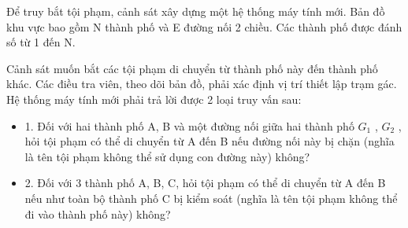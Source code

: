 Để truy bắt tội phạm, cảnh sát xây dựng một hệ thống máy tính mới. Bản đồ khu vực bao gồm N thành phố và E đường nối 2 chiều. Các thành phố được đánh số từ 1 đến N.  

   Cảnh sát muốn bắt các tội phạm di chuyển từ thành phố này đến thành phố khác. Các điều tra viên, theo dõi bản đồ, phải xác định vị trí thiết lập trạm gác. Hệ thống máy tính mới phải trả lời được 2 loại   truy vấn sau:  
\begin{itemize}
	\item     1. Đối với hai thành phố A, B và một đường nối giữa hai thành phố $G_{1}$    , $G_{2}$    , hỏi tội phạm có thể di chuyển từ A đến B nếu đường nối này bị chặn (nghĩa là tên tội phạm không   thể sử dụng con đường này) không?   
	\item     2. Đối với 3 thành phố A, B, C, hỏi tội phạm có thể di chuyển từ A đến B nếu như toàn bộ thành phố C bị kiểm soát (nghĩa là tên tội phạm không thể đi vào thành phố này) không?   
\end{itemize}